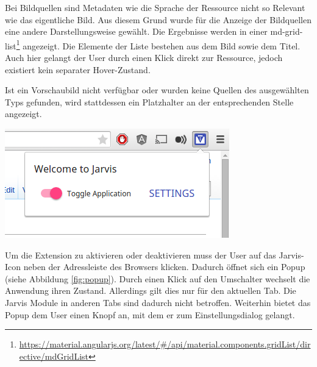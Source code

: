  Bei Bildquellen sind Metadaten wie die Sprache der Ressource nicht so Relevant wie das eigentliche Bild. Aus diesem Grund wurde für die Anzeige der Bildquellen eine andere Darstellungsweise gewählt. Die Ergebnisse werden in einer md-grid-list\footnote{\url{https://material.angularjs.org/latest/\#/api/material.components.gridList/directive/mdGridList}} angezeigt. Die Elemente der Liste bestehen aus dem Bild sowie dem Titel. Auch hier gelangt der User durch einen Klick direkt zur Ressource, jedoch existiert kein separater Hover-Zustand.

 Ist ein Vorschaubild nicht verfügbar oder wurden keine Quellen des ausgewählten Typs gefunden, wird stattdessen ein Platzhalter an der entsprechenden Stelle angezeigt.

 \begin{minipage}{\linewidth}
	\centering
	\vspace*{0.5cm}
	\includegraphics[scale=0.6]{Bilder/app-screenshots/popup.png}
	\label{fig:popup}
	\vspace*{0.5cm}
 \end{minipage}

 Um die Extension zu aktivieren oder deaktivieren muss der User auf das Jarvis-Icon neben der Adressleiste des Browsers klicken. Dadurch öffnet sich ein Popup (siehe Abbildung \ref{fig:popup}). Durch einen Klick auf den Umschalter wechselt die Anwendung ihren Zustand. Allerdings gilt dies nur für den aktuellen Tab. Die Jarvis Module in anderen Tabs sind dadurch nicht betroffen. Weiterhin bietet das Popup dem User einen Knopf an, mit dem er zum Einstellungsdialog gelangt.


